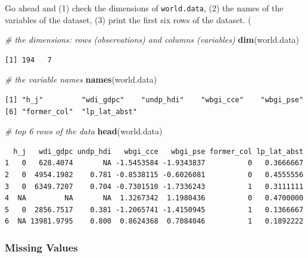 \documentclass[]{article}
\newenvironment{Shaded}{\begin{snugshade}}{\end{snugshade}}
\newcommand{\KeywordTok}[1]{\textcolor[rgb]{0.13,0.29,0.53}{\textbf{#1}}}
\newcommand{\CommentTok}[1]{\textcolor[rgb]{0.56,0.35,0.01}{\textit{#1}}}
\newcommand{\NormalTok}[1]{#1}
\theoremstyle{definition}
\theoremstyle{definition}
\theoremstyle{definition}
\theoremstyle{remark}
\begin{document}
Go ahead and (1) check the dimensions of \texttt{world.data}, (2) the
names of the variables of the dataset, (3) print the first six rows of
the dataset. (

\begin{Shaded}
\begin{Highlighting}[]
\CommentTok{# the dimensions: rows (observations) and columns (variables) }
\KeywordTok{dim}\NormalTok{(world.data)}
\end{Highlighting}
\end{Shaded}

\begin{verbatim}
[1] 194   7
\end{verbatim}

\begin{Shaded}
\begin{Highlighting}[]
\CommentTok{# the variable names}
\KeywordTok{names}\NormalTok{(world.data) }
\end{Highlighting}
\end{Shaded}

\begin{verbatim}
[1] "h_j"         "wdi_gdpc"    "undp_hdi"    "wbgi_cce"    "wbgi_pse"   
[6] "former_col"  "lp_lat_abst"
\end{verbatim}

\begin{Shaded}
\begin{Highlighting}[]
\CommentTok{# top 6 rows of the data}
\KeywordTok{head}\NormalTok{(world.data)}
\end{Highlighting}
\end{Shaded}

\begin{verbatim}
  h_j   wdi_gdpc undp_hdi   wbgi_cce   wbgi_pse former_col lp_lat_abst
1   0   628.4074       NA -1.5453584 -1.9343837          0   0.3666667
2   0  4954.1982    0.781 -0.8538115 -0.6026081          0   0.4555556
3   0  6349.7207    0.704 -0.7301510 -1.7336243          1   0.3111111
4  NA         NA       NA  1.3267342  1.1980436          0   0.4700000
5   0  2856.7517    0.381 -1.2065741 -1.4150945          1   0.1366667
6  NA 13981.9795    0.800  0.8624368  0.7084046          1   0.1892222
\end{verbatim}

\subsubsection{Missing Values}\label{missing-values}
\end{document}
